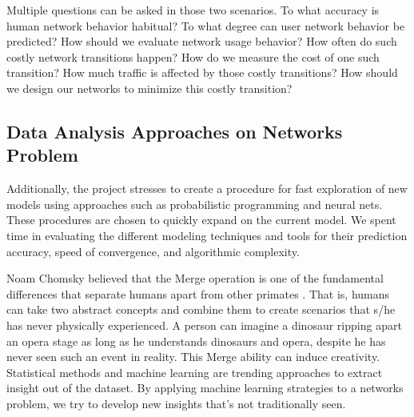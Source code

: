 \documentclass[]{article}
\begin{document}
Multiple questions can be asked in those two scenarios. To what accuracy is human network behavior habitual? To what degree can user network behavior be predicted? How should we evaluate network usage behavior? How often do such costly network transitions happen? How do we measure the cost of one such transition? How much traffic is affected by those costly transitions? How should we design our networks to minimize this costly transition?



\subsection{Data Analysis Approaches on Networks Problem}

Additionally, the project stresses to create a procedure for fast exploration of new models using approaches such as probabilistic programming and neural nets. These procedures are chosen to quickly expand on the current model. We spent time in evaluating the different modeling techniques and tools for their prediction accuracy, speed of convergence, and algorithmic complexity. 

Noam Chomsky believed that the Merge operation is one of the fundamental differences that separate humans apart from other primates \cite{whyonlyus}. That is, humans can take two abstract concepts and combine them to create scenarios that s/he has never physically experienced. A person can imagine a dinosaur ripping apart an opera stage as long as he understands dinosaurs and opera, despite he has never seen such an event in reality. This Merge ability can induce creativity. Statistical methods and machine learning are trending approaches to extract insight out of the dataset. By applying machine learning strategies to a networks problem, we try to develop new insights that's not traditionally seen.
\end{document}
